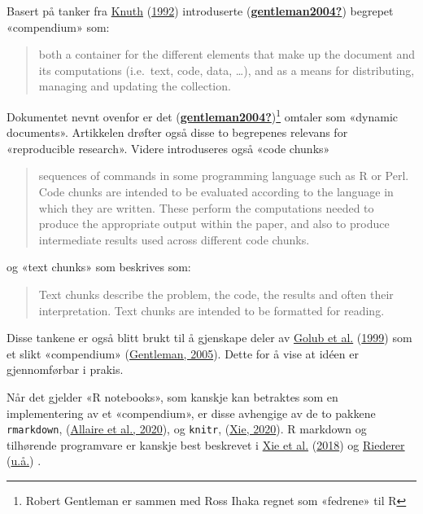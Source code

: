 \documentclass[
  12pt,
  norsk,
]{article}
\begin{document}
Basert på tanker fra \protect\hyperlink{ref-knuth1992}{Knuth}
(\protect\hyperlink{ref-knuth1992}{1992}) introduserte
(\protect\hyperlink{ref-gentleman2004}{\textbf{gentleman2004?}})
begrepet «compendium» som:

\begin{quote}
both a container for the different elements that make up the document
and its computations (i.e.~text, code, data, \ldots), and as a means for
distributing, managing and updating the collection.
\end{quote}

Dokumentet nevnt ovenfor er det
(\protect\hyperlink{ref-gentleman2004}{\textbf{gentleman2004?}})\footnote{Robert
  Gentleman er sammen med Ross Ihaka regnet som «fedrene» til R} omtaler
som «dynamic documents». Artikkelen drøfter også disse to begrepenes
relevans for «reproducible research». Videre introduseres også «code
chunks»

\begin{quote}
sequences of commands in some programming language such as R or Perl.
Code chunks are intended to be evaluated according to the language in
which they are written. These perform the computations needed to produce
the appropriate output within the paper, and also to produce
intermediate results used across different code chunks.
\end{quote}

og «text chunks» som beskrives som:

\begin{quote}
Text chunks describe the problem, the code, the results and often their
interpretation. Text chunks are intended to be formatted for reading.
\end{quote}

Disse tankene er også blitt brukt til å gjenskape deler av
\protect\hyperlink{ref-golub1999}{Golub et al.}
(\protect\hyperlink{ref-golub1999}{1999}) som et slikt «compendium»
(\protect\hyperlink{ref-gentleman2005}{Gentleman, 2005}). Dette for å
vise at idéen er gjennomførbar i prakis.

Når det gjelder «R notebooks», som kanskje kan betraktes som en
implementering av et «compendium», er disse avhengige av de to pakkene
\texttt{rmarkdown}, (\protect\hyperlink{ref-allaire2020}{Allaire et al.,
2020}), og \texttt{knitr}, (\protect\hyperlink{ref-xie2020}{Xie, 2020}).
R markdown og tilhørende programvare er kanskje best beskrevet i
\protect\hyperlink{ref-xie2018}{Xie et al.}
(\protect\hyperlink{ref-xie2018}{2018}) og
\protect\hyperlink{ref-riederer}{Riederer}
(\protect\hyperlink{ref-riederer}{u.å.}) .
\end{document}
